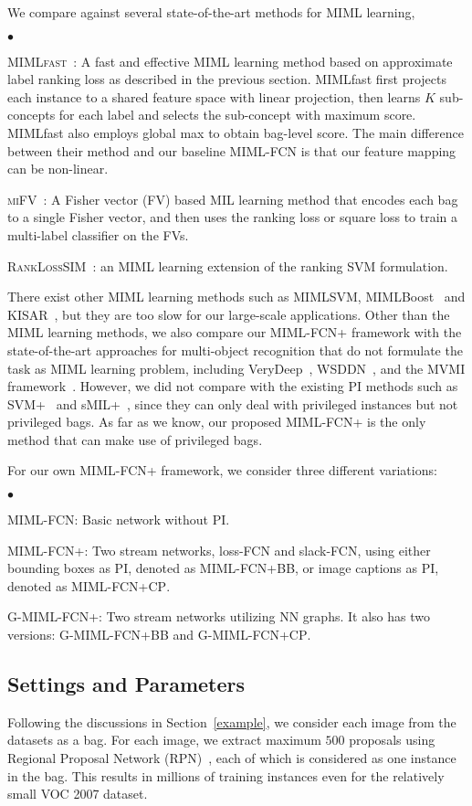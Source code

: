 \documentclass[10pt,twocolumn,letterpaper]{article}
\newcommand{\squishlist}{
	\begin{list}{$\bullet$}
		{ \setlength{\itemsep}{0pt}
			\setlength{\parsep}{1pt}
			\setlength{\topsep}{1pt}
			\setlength{\partopsep}{0pt}
			\setlength{\leftmargin}{1.5em}
			\setlength{\labelwidth}{1em}
			\setlength{\labelsep}{0.5em} } }
\newcommand{\squishend}{
	\end{list}  }
\begin{document}
We compare against several state-of-the-art methods for MIML
learning, \squishlist \item \textsc{MIMLfast}~\cite{Huang2014}: A
fast and effective MIML learning method based on approximate label
ranking loss as described in the previous section. MIMLfast first
projects each instance to a shared feature space with linear
projection, then learns $K$ sub-concepts for each label and
selects the sub-concept with maximum score. MIMLfast also employs
global max to obtain bag-level score. The main difference between
their method and our baseline MIML-FCN is that our feature mapping
can be non-linear. \item \textsc{miFV}~\cite{Wu2014}: A Fisher
vector (FV) based MIL learning method that encodes each bag to a
single Fisher vector, and then uses the ranking loss or square
loss to train a multi-label classifier on the FVs. \item 
\textsc{RankLossSIM}~\cite{Briggs2012}: an MIML learning extension
of the ranking SVM formulation. \squishend

There exist other MIML learning methods such as MIMLSVM,
MIMLBoost~\cite{Zhou2006} and KISAR~\cite{Li2012}, but they are
too slow for our large-scale applications. Other than the MIML
learning methods, we also compare our \textsc{MIML-FCN+} framework
with the state-of-the-art approaches for multi-object recognition
that do not formulate the task as MIML learning problem, including
VeryDeep~\cite{Simonyan2014}, WSDDN~\cite{Bilen2016}, and the MVMI
framework~\cite{Yang2016a}. However, we did not compare with the
existing PI methods such as SVM+~\cite{Vapnik2009} and
sMIL+~\cite{Li2014}, since they can only deal with privileged
instances but not privileged bags. As far as we know, our proposed
\textsc{MIML-FCN+} is the only method that can make use of
privileged bags.

For our own \textsc{MIML-FCN+} framework, we consider three
different variations: \squishlist \item \textsc{MIML-FCN}: Basic
network without PI. \item \textsc{MIML-FCN+}: Two stream networks,
loss-FCN and slack-FCN, using either bounding boxes as PI, denoted
as \textsc{MIML-FCN+BB}, or image captions as PI, denoted as
\textsc{MIML-FCN+CP}. \item \textsc{G-MIML-FCN+}: Two stream
networks utilizing NN graphs. It also has two versions:
\textsc{G-MIML-FCN+BB} and \textsc{G-MIML-FCN+CP}. \squishend

\subsection{Settings and Parameters}
Following the discussions in Section~\ref{example}, we consider
each image from the datasets as a bag. For each image, we extract
maximum $500$ proposals using Regional Proposal Network
(RPN)~\cite{Ren2015}, each of which is considered as one instance
in the bag. This results in millions of training instances even
for the relatively small \textsc{VOC 2007} dataset.
\end{document}
